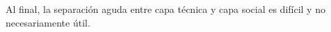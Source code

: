 Al final, la separación aguda entre capa técnica y capa social es difícil y no necesariamente útil.

\begin{comment}

[FiTre2015]
"we show how the current revival of grassroots community networks can counterbalance the erosion of autonomy of Internet users that results from current
telecom policies."

it's an ongoing work -- the infrastructure crumples if people cease to maintain it and provide broadband

---
[Rieder2012]

> As Jens Jessen, has recently pointed out in
> Die Zeit, it is democracy that guarantees a
> free Internet and not the other way around.
--> Siehe China, Iran, Cuba etc;
In dem Kontext verorten sich auch solche Projekte wie Altermundi

"We are creating a world that all may enter without privilege or prejudice
accorded by race, economic power, military force, or station of birth."
“We are creating a world where anyone, anywhere may express his or her beliefs, no matter how singu-
lar, without fear of being coerced into silence or conformity.” (Barlow 1996)
--> oder auch nicht --> siehe oben; community networks versuchen das aber wirklich umzusetzen

"Especially in American research and critical comment, there
seems to be a widely shared view according to which the Internet allows capillary configurations
of power – local initiatives, ad-hoc pressure groups, fan cultures, “issue publics” – to challenge
the statutory powers that be." (p.4)
--> aber um diese ueberhaupt moeglich zu sein, brauchen die Leute erstmal einen Zugang zu einer physischen Infrastruktur, der gar nicht so selbsverstaendlich gegeben ist.
--> koloniale Zusammenhaenge und Logiken werden reproduziert; aufgrund von geographischen (schwieriges Terrain), oekonomischen (Anbindung lohnt sich fuer kommerzielle Anbierter*innen nicht), politischen (der Staat oder X, dass sich Y Verhoer verschaffen kann) Gruende, haben Menschen keinen Zugriff zum Internet

[Rieder2012]

> framing the Internet alternately as lawless, anarchic,
> free, “a world where anyone, anywhere may express his or her beliefs, no matter how singular,
> without fear of being coerced into silence or conformity” (Barlow 1996) (p.1)

* la infraestructura está prerequisito para participación

## Conclusión del texto [Rieder2012]

> If technology won’t deliver us from the conundrums of
> governance, negotiation, and struggle, we
> may as well reengage politics proper[ly].

* sobre todo problemas sociales/políticos: organización de grupos (no tanto técnicos): ¿cómo decidimos como grupo? ¿quién hace qué? ¿quién está responsable?
* soluciones políticas para problemas políticos
\end{comment}

